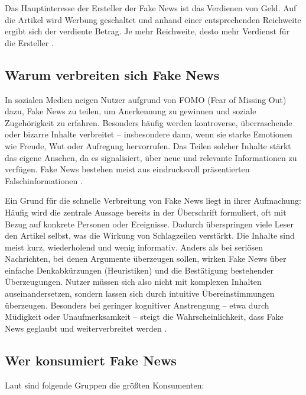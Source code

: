 Das Hauptinteresse der Ersteller der Fake News ist das Verdienen von Geld. Auf die Artikel wird Werbung geschaltet und 
anhand einer entsprechenden Reichweite ergibt sich der verdiente Betrag. Je mehr Reichweite, desto mehr Verdienst für die Ersteller \cite{socsci9100185}.

\subsection{Warum verbreiten sich Fake News}

In sozialen Medien neigen Nutzer aufgrund von FOMO (Fear of Missing Out) dazu, Fake News zu teilen, um Anerkennung zu gewinnen und soziale Zugehörigkeit zu erfahren. 
Besonders häufig werden kontroverse, überraschende oder bizarre Inhalte verbreitet – insbesondere dann, wenn sie starke Emotionen wie Freude, Wut oder Aufregung hervorrufen. 
Das Teilen solcher Inhalte stärkt das eigene Ansehen, da es signalisiert, über neue und relevante Informationen zu verfügen. 
Fake News bestehen meist aus eindrucksvoll präsentierten Falschinformationen \cite{socsci9100185}.

Ein Grund für die schnelle Verbreitung von Fake News liegt in ihrer Aufmachung: Häufig wird die zentrale Aussage bereits in der Überschrift formuliert, 
oft mit Bezug auf konkrete Personen oder Ereignisse. Dadurch überspringen viele Leser den Artikel selbst, was die Wirkung von Schlagzeilen verstärkt. 
Die Inhalte sind meist kurz, wiederholend und wenig informativ. Anders als bei seriösen Nachrichten, bei denen Argumente überzeugen sollen, wirken Fake News über einfache Denkabkürzungen (Heuristiken) und die Bestätigung bestehender Überzeugungen. 
Nutzer müssen sich also nicht mit komplexen Inhalten auseinandersetzen, sondern lassen sich durch intuitive Übereinstimmungen überzeugen. 
Besonders bei geringer kognitiver Anstrengung – etwa durch Müdigkeit oder Unaufmerksamkeit – steigt die Wahrscheinlichkeit, dass Fake News geglaubt und weiterverbreitet werden \cite{horne2017}.

\subsection{Wer konsumiert Fake News}

Laut \cite{horne2017} sind folgende Gruppen die größten Konsumenten:

